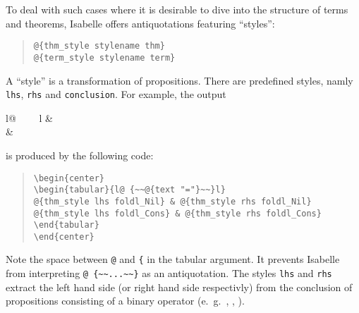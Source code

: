 \begin{isabellebody}
\begin{isamarkuptext}
  To deal with such cases where it is desirable to dive into the structure
  of terms and theorems, Isabelle offers antiquotations featuring
  ``styles'':

    \begin{quote}
    \verb!@!\verb!{thm_style stylename thm}!\\
    \verb!@!\verb!{term_style stylename term}!
    \end{quote}

  A ``style'' is a transformation of propositions. There are predefined
  styles, namly \verb!lhs!, \verb!rhs! and \verb!conclusion!. For example, 
  the output
  \begin{center}
  \begin{tabular}{l@ {~~\isa{{\isacharequal}}~~}l}
   & \\
   & 
  \end{tabular}
  \end{center}
  is produced by the following code:
  \begin{quote}
    \verb!\begin{center}!\\
    \verb!\begin{tabular}{l@ {~~!\verb!@!\verb!{text "="}~~}l}!\\
    \verb!@!\verb!{thm_style lhs foldl_Nil} & @!\verb!{thm_style rhs foldl_Nil}!\\
    \verb!@!\verb!{thm_style lhs foldl_Cons} & @!\verb!{thm_style rhs foldl_Cons}!\\
    \verb!\end{tabular}!\\
    \verb!\end{center}!
  \end{quote}
  Note the space between \verb!@! and \verb!{! in the tabular argument.
  It prevents Isabelle from interpreting \verb!@ {~~...~~}! 
  as an antiquotation. The styles \verb!lhs! and \verb!rhs!
  extract the left hand side (or right hand side respectivly) from the
  conclusion of propositions consisting of a binary operator
  (e.~g.~\isa{{\isacharequal}}, \isa{{\isasymequiv}}, \isa{{\isacharless}}).


\end{isamarkuptext}
\end{isabellebody}
